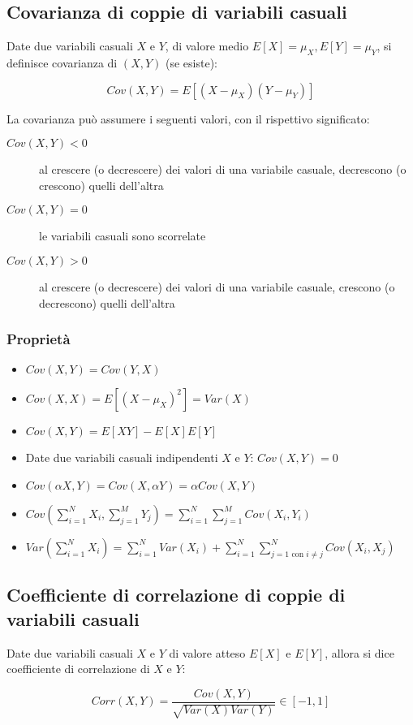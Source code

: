 \documentclass{article}
\begin{document}
\subsection{Covarianza di coppie di variabili casuali}

Date due variabili casuali $X$ e $Y$, di valore medio $E[X]=\mu_X, E[Y]=\mu_Y$, si definisce covarianza di $(X,Y)$ (se esiste):

$$
Cov(X,Y) = E[(X-\mu_X)(Y-\mu_Y)]
$$

\noindent
La covarianza può assumere i seguenti valori, con il rispettivo significato:

\begin{description}
    \item[$Cov(X,Y) < 0$] al crescere (o decrescere) dei valori di una variabile casuale, decrescono (o crescono) quelli dell'altra
    \item[$Cov(X,Y) = 0$] le variabili casuali sono scorrelate
    \item[$Cov(X,Y) > 0$] al crescere (o decrescere) dei valori di una variabile casuale, crescono (o decrescono) quelli dell'altra
\end{description}

\subsubsection{Proprietà}

\begin{itemize}
    \item $Cov(X,Y) = Cov(Y,X)$
    \item $Cov(X,X) = E[(X-\mu_X)^2] = Var(X)$
    \item $Cov(X,Y) = E[XY] - E[X]E[Y]$
    \item Date due variabili casuali indipendenti $X$ e $Y$: $Cov(X,Y) = 0$
    \item $Cov(\alpha X,Y) = Cov(X, \alpha Y) = \alpha Cov(X,Y)$
    \item $Cov(\sum^N_{i=1}X_i, \sum^M_{j=1}Y_j) = \sum^N_{i=1}\sum^M_{j=1} Cov(X_i,Y_i)$
    \item $Var(\sum^N_{i=1}X_i) = \sum^N_{i=1} Var(X_i) + \sum^N_{i=1}\sum^N_{j=1 \text{ con } i \neq j} Cov(X_i, X_j)$
\end{itemize}

\subsection{Coefficiente di correlazione di coppie di variabili casuali}

Date due variabili casuali $X$ e $Y$ di valore atteso $E[X]$ e $E[Y]$, allora si dice coefficiente di correlazione di $X$ e $Y$:

$$
Corr(X,Y) = \frac{Cov(X,Y)}{\sqrt{Var(X)Var(Y)}} \in [-1, 1]
$$
\end{document}
